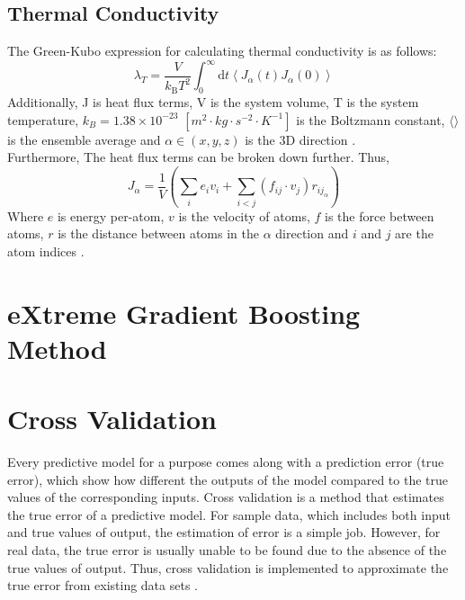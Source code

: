 \subsection{Thermal Conductivity}
The Green-Kubo expression for calculating thermal conductivity is as follows:
\begin{equation}
    \lambda_{T}=\frac{V}{k_{\mathrm{B}} T^{2}} \int_{0}^{\infty} \mathrm{d} t\left\langle J_{\alpha}(t) J_{\alpha}(0)\right\rangle
\end{equation}
Additionally, J is heat flux terms, 
V is the system volume, 
T is the system temperature, 
$k_B=1.38 \times 10^{-23}$ $[m^2\cdot kg\cdot s^{-2}\cdot K^{-1}]$ is the Boltzmann constant, 
$\langle \rangle$ is the ensemble average and
$\alpha \in (x, y, z)$ is the 3D direction \cite{hansen_theory_2013}.\\
Furthermore, The heat flux terms can be broken down further. Thus,
\begin{equation}
    J_{\alpha}=\frac{1}{V}\left(\sum_{i} e_{i} v_{i}+\sum_{i<j}\left(f_{i j} \cdot v_{j}\right) r_{i j_{\alpha}}\right)
\end{equation}
Where $e$ is energy per-atom, 
$v$ is the velocity of atoms, 
$f$ is the force between atoms, 
$r$ is the distance between atoms in the $\alpha$ direction and 
$i$ and $j$ are the atom indices \cite{manjunatha_development_2018}.
\section{eXtreme Gradient Boosting Method}

\section{Cross Validation}
Every predictive model for a purpose comes along with a prediction error 
(true error), which show how different the outputs of the model compared 
to the true values of the corresponding inputs. Cross validation is a method 
that estimates the true error of a predictive model. For sample data, which 
includes both input and true values of output, the estimation of error is a 
simple job. However, for real data, the true error is usually unable to be 
found due to the absence of the true values of output. Thus, cross validation 
is implemented to approximate the true error from existing data sets 
\cite{rodriguez_sensitivity_2010}.
